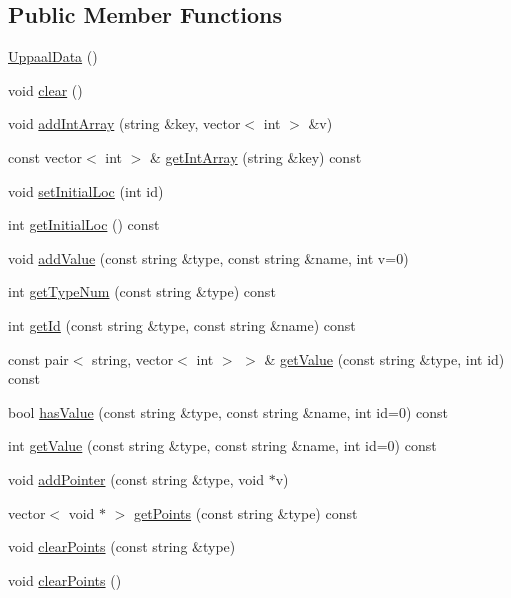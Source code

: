 \subsection*{Public Member Functions}
\begin{DoxyCompactItemize}
\item 
\mbox{\hyperlink{classgraphsat_1_1_uppaal_data_af50032132fe9113f17b9d4f669832bcf}{Uppaal\+Data}} ()
\item 
void \mbox{\hyperlink{classgraphsat_1_1_uppaal_data_a470caa8beeb50129e99a4ca086bc71c0}{clear}} ()
\item 
void \mbox{\hyperlink{classgraphsat_1_1_uppaal_data_a7efc419d4d89f6f54f1b37e6a0ac76da}{add\+Int\+Array}} (string \&key, vector$<$ int $>$ \&v)
\item 
const vector$<$ int $>$ \& \mbox{\hyperlink{classgraphsat_1_1_uppaal_data_ae7ca546770b68997fac809beec05709f}{get\+Int\+Array}} (string \&key) const
\item 
void \mbox{\hyperlink{classgraphsat_1_1_uppaal_data_a00ac5e60eb80a5e7684653a9ff81c6a2}{set\+Initial\+Loc}} (int id)
\item 
int \mbox{\hyperlink{classgraphsat_1_1_uppaal_data_a261013813b76f6590e4c5e9b52fe8e12}{get\+Initial\+Loc}} () const
\item 
void \mbox{\hyperlink{classgraphsat_1_1_uppaal_data_a50f0cab2fb2e5624b39068e49d4c51ee}{add\+Value}} (const string \&type, const string \&name, int v=0)
\item 
int \mbox{\hyperlink{classgraphsat_1_1_uppaal_data_a1c420132ab6e3cfe21bd0fec604c8519}{get\+Type\+Num}} (const string \&type) const
\item 
int \mbox{\hyperlink{classgraphsat_1_1_uppaal_data_a39f89632de7e1d1a1f2b1fb1fbd05bd1}{get\+Id}} (const string \&type, const string \&name) const
\item 
const pair$<$ string, vector$<$ int $>$ $>$ \& \mbox{\hyperlink{classgraphsat_1_1_uppaal_data_a0990d1da543e593b05bba3791cd351d8}{get\+Value}} (const string \&type, int id) const
\item 
bool \mbox{\hyperlink{classgraphsat_1_1_uppaal_data_ac64e8295d429d836f76bbec12eb7fa76}{has\+Value}} (const string \&type, const string \&name, int id=0) const
\item 
int \mbox{\hyperlink{classgraphsat_1_1_uppaal_data_a888305aeaea6a3df4c01950155a14c24}{get\+Value}} (const string \&type, const string \&name, int id=0) const
\item 
void \mbox{\hyperlink{classgraphsat_1_1_uppaal_data_a8da77b23b7dc06303c819748398a2e27}{add\+Pointer}} (const string \&type, void $\ast$v)
\item 
vector$<$ void $\ast$ $>$ \mbox{\hyperlink{classgraphsat_1_1_uppaal_data_ad421061c61d3f2012e261c28d44df2be}{get\+Points}} (const string \&type) const
\item 
void \mbox{\hyperlink{classgraphsat_1_1_uppaal_data_aa8135b656e806c6c246c45ee88d227fd}{clear\+Points}} (const string \&type)
\item 
void \mbox{\hyperlink{classgraphsat_1_1_uppaal_data_a6f8e7702012896ac9757a11b7576546a}{clear\+Points}} ()
\end{DoxyCompactItemize}

